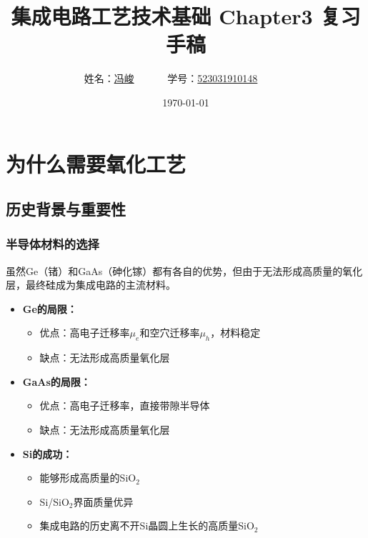 \documentclass[UTF8,12pt,a4paper]{ctexart}
\title{集成电路工艺技术基础 Chapter3 复习手稿}
\author{
	姓名：\underline{冯峻}~~~~~~
	学号：\underline{523031910148}~~~~~~}
\date{\today}
\begin{document}
\fancyfoot[C]{\thepage}

\maketitle
\tableofcontents
\newpage

\section{为什么需要氧化工艺}

\subsection{历史背景与重要性}

\subsubsection{半导体材料的选择}

虽然Ge（锗）和GaAs（砷化镓）都有各自的优势，但由于无法形成高质量的氧化层，最终硅成为集成电路的主流材料。

\begin{itemize}
    \item \textbf{Ge的局限：}
    \begin{itemize}
        \item 优点：高电子迁移率$\mu_e$和空穴迁移率$\mu_h$，材料稳定
        \item 缺点：无法形成高质量氧化层
    \end{itemize}
    
    \item \textbf{GaAs的局限：}
    \begin{itemize}
        \item 优点：高电子迁移率，直接带隙半导体
        \item 缺点：无法形成高质量氧化层
    \end{itemize}
    
    \item \textbf{Si的成功：}
    \begin{itemize}
        \item 能够形成高质量的SiO$_2$
        \item Si/SiO$_2$界面质量优异
        \item 集成电路的历史离不开Si晶圆上生长的高质量SiO$_2$
    \end{itemize}
\end{itemize}
\end{document}
